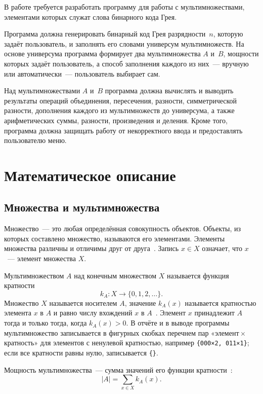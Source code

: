 \documentclass[14pt,a4paper]{extarticle}
\newcommand{\code}[1]{\texttt{#1}}
\newcommand{\kA}{k_A(x)}
\newcommand{\Nset}{\{0, 1, 2, \ldots\}}
\begin{document}
В работе требуется разработать программу для работы с мультимножествами, элементами которых служат слова бинарного кода Грея.

Программа должна генерировать бинарный код Грея разрядности~$n$, которую задаёт пользователь, и заполнять его словами универсум мультимножеств. На основе универсума программа формирует два мультимножества $A$ и~$B$, мощности которых задаёт пользователь, а способ заполнения каждого из них~--- вручную или автоматически~--- пользователь выбирает сам.

Над мультимножествами $A$ и~$B$ программа должна вычислять и выводить результаты операций объединения, пересечения, разности, симметрической разности, дополнения каждого из мультимножеств до универсума, а также арифметических суммы, разности, произведения и деления. Кроме того, программа должна защищать работу от некорректного ввода и предоставлять пользователю меню.

\section{Математическое описание}

\subsection{Множества и мультимножества}\label{sec:mset}

Множество~--- это любая определённая совокупность объектов. Объекты, из которых составлено множество, называются его элементами. Элементы множества различны и отличимы друг от друга~\cite{novikov}. Запись $x \in X$ означает, что $x$~--- элемент множества $X$.

Мультимножеством $A$ над конечным множеством $X$ называется функция кратности
\begin{equation}\label{eq:kfun}
k_A \colon X \to \Nset .
\end{equation}
Множество $X$ называется носителем $A$, значение $\kA$ называется кратностью элемента $x$ в $A$ и равно числу вхождений $x$ в $A$~\cite{novikov, vostrov}. Элемент $x$ принадлежит $A$ тогда и только тогда, когда $\kA > 0$. В отчёте и в выводе программы мультимножество записывается в фигурных скобках перечнем пар «элемент${}\times{}$кратность» для элементов с ненулевой кратностью, например \code{\{000×2, 011×1\}}; если все кратности равны нулю, записывается \code{\{\}}.

Мощность мультимножества~--- сумма значений его функции кратности~\cite{novikov}:
\begin{equation}\label{eq:card}
|A| = \sum_{x \in X} \kA .
\end{equation}
\end{document}
